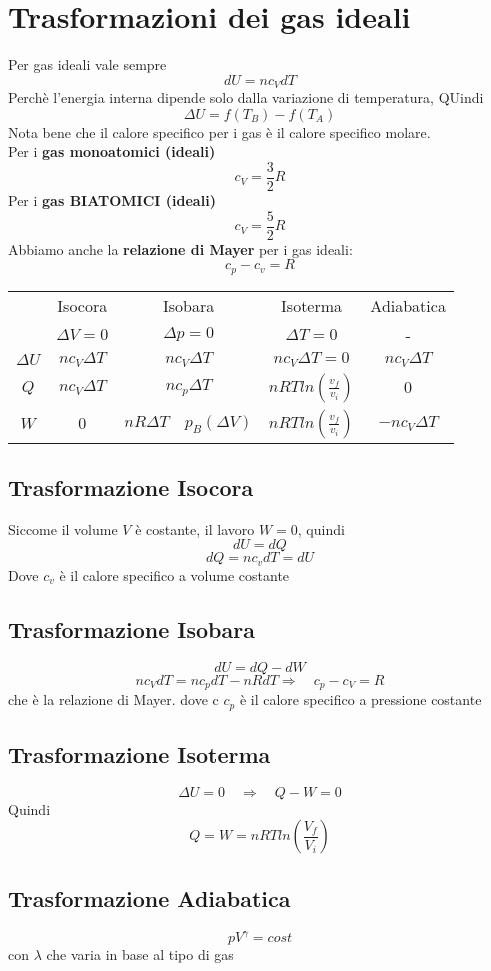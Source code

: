 \documentclass[a4paper]{report}
\begin{document}
  \section{Trasformazioni dei gas ideali}
  Per gas ideali vale sempre
  $$ dU = n c_V dT $$
  Perchè l'energia interna dipende solo dalla variazione di temperatura, QUindi
  $$ \Delta U = f(T_B) -  f(T_A)$$
  Nota bene che il calore specifico per i gas è il calore specifico molare.\\
  Per i \textbf{gas monoatomici (ideali)}
  $$c_V = \frac{3}{2}R$$
  Per i \textbf{gas BIATOMICI (ideali)}
  $$c_V = \frac{5}{2} R$$
  Abbiamo anche la \textbf{relazione di Mayer} per i gas ideali:
  $$c_p - c_v = R$$
  \begin{center}
  \begin{tabular}{ |c|c|c|c|c| }
   \hline
    & Isocora & Isobara & Isoterma & Adiabatica \\
    & $\Delta V = 0$ & $\Delta p = 0$ & $\Delta T = 0$ & -\\
   \hline
   $\Delta U$ & $n c_V \Delta T$ & $n c_V \Delta T$ & $n c_V  \Delta T = 0$ & $n c_V \Delta T$ \\
   $Q$ & $n c_V \Delta T$ & $n c_p \Delta T$ & $nRTln(\frac{v_f}{v_i})$ & $0$\\
   $W$ & $0$ & $ nR\Delta T \quad p_B(\Delta V)$ & $nRTln(\frac{v_f}{v_i})$ & $-n c_V \Delta T$ \\
   \hline
  \end{tabular}
  \end{center}
  \subsection{Trasformazione Isocora}
  Siccome il volume $V$ è costante, il lavoro $W = 0$, quindi
  $$ dU=dQ $$
  $$ dQ = nc_vdT = dU$$
  Dove $c_v$ è il calore specifico a volume costante
  \subsection{Trasformazione Isobara}
  $$ dU = dQ-dW $$
  $$ n  c_V dT = n c_p dT - nR dT \Rightarrow \quad c_p -c_V = R $$
  che è la relazione di Mayer. dove c $c_p$ è il calore specifico a pressione costante
  \subsection{Trasformazione Isoterma}
  $$ \Delta U = 0 \quad \Rightarrow \quad Q-W =0 $$
  Quindi
  $$ Q = W = n R T ln(\frac{V_f}{V_i}) $$
  \subsection{Trasformazione Adiabatica}
  $$ p V^{\gamma} = cost $$
  con $\lambda$ che varia in base al tipo di gas
\end{document}
